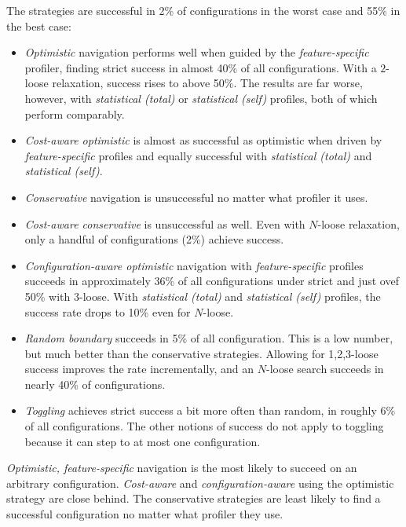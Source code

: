 The strategies are successful in 2\% of configurations in the worst case and
55\% in the best case:
\begin{itemize}
  \item
    \emph{Optimistic} navigation performs well when guided by the \emph{feature-specific} profiler,
    finding strict success in almost 40\% of all configurations.
    With a $2$-loose relaxation, success rises to above 50\%.
    The results are far worse, however, with \emph{statistical (total)} or \emph{statistical (self)}
    profiles, both of which perform comparably.

  \item
    \emph{Cost-aware optimistic} is almost as successful as optimistic when driven
    by \emph{feature-specific} profiles and equally successful with \emph{statistical (total)}
    and \emph{statistical (self)}.

  \item
    \emph{Conservative} navigation is unsuccessful no matter what profiler it uses.

  \item
    \emph{Cost-aware conservative} is unsuccessful as well.
    Even with $N$-loose relaxation, only a handful of configurations (2\%) achieve success.

  \item
    \emph{Configuration-aware optimistic} navigation with
    \emph{feature-specific} profiles succeeds in approximately 36\% of all
    configurations under strict and just ovef 50\% with $3$-loose.
    With \emph{statistical (total)} and \emph{statistical (self)} profiles,
    the success rate drops to 10\% even for $N$-loose.

  \item
    \emph{Random boundary} succeeds in 5\% of all configuration.
    This is a low number, but much better than the conservative strategies.
    Allowing for 1,2,3-loose success improves the rate incrementally, and an $N$-loose search
    succeeds in nearly 40\% of configurations.

  \item
    \emph{Toggling} achieves strict success a bit more often than random, in roughly 6\% of all configurations.
    The other notions of success do not apply to toggling because it can step to at most one configuration.
\end{itemize}

\emph{Optimistic, feature-specific} navigation is the most likely to
succeed on an arbitrary configuration.
\emph{Cost-aware} and \emph{configuration-aware} using the optimistic strategy
are close behind.
The conservative strategies are least likely to find a successful configuration
no matter what profiler they use.

